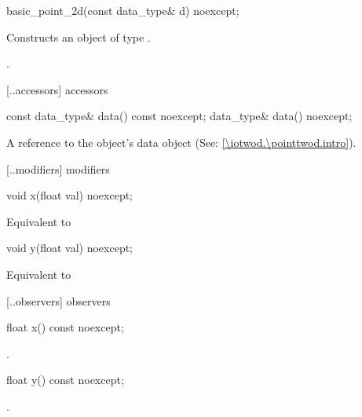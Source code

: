 %
\begin{itemdecl}
basic_point_2d(const data_type& d) noexcept;
\end{itemdecl}
\begin{itemdescr}
\pnum
\effects
Constructs an object of type .

\pnum
\postconditions
{}.
\end{itemdescr}

 [\iotwod.\pointtwod.accessors]{ accessors}

%
\begin{itemdecl}
const data_type& data() const noexcept;
data_type& data() noexcept;
\end{itemdecl}
\begin{itemdescr}
\pnum
\returns
A reference to the  object's data object (See: \ref{\iotwod.\pointtwod.intro}).
\end{itemdescr}

 [\iotwod.\pointtwod.modifiers]{ modifiers}

%
\begin{itemdecl}
void x(float val) noexcept;
\end{itemdecl}
\begin{itemdescr}
\pnum
\effects
Equivalent to 
\end{itemdescr}

%
\begin{itemdecl}
void y(float val) noexcept;
\end{itemdecl}
\begin{itemdescr}
\pnum
\effects
Equivalent to 
\end{itemdescr}

 [\iotwod.\pointtwod.observers]{ observers}

%
\begin{itemdecl}
float x() const noexcept;
\end{itemdecl}
\begin{itemdescr}
\pnum
\returns
{}.
\end{itemdescr}

%
\begin{itemdecl}
float y() const noexcept;
\end{itemdecl}
\begin{itemdescr}
\pnum
\returns
{}.
\end{itemdescr}

